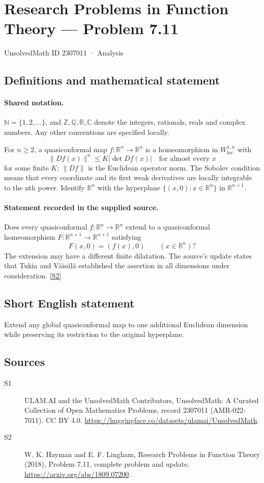 \documentclass[11pt]{article}
\newcommand{\sref}[2]{\hyperlink{source:#1:#2}{[S#2]}}
\begin{document}
\setcounter{section}{2307010}
\section{Research Problems in Function Theory — Problem 7.11}\label{2307011}
{\small\sffamily UnsolvedMath ID 2307011 · Analysis}
\subsection{Definitions and mathematical statement}

\paragraph{Shared notation.}$\mathbb N=\{1,2,\ldots\}$, and $\mathbb Z,\mathbb Q,\mathbb R,\mathbb C$ denote the integers, rationals, reals and complex numbers. Any other conventions are specified locally.


For $n\geq2$, a quasiconformal map $f:\mathbb R^n\to\mathbb R^n$ is a homeomorphism in $W^{1,n}_{\mathrm{loc}}$ with
\[\|Df(x)\|^n\leq K|\det Df(x)|\quad\text{for almost every }x\]
for some finite $K$; $\|Df\|$ is the Euclidean operator norm. The Sobolev condition means that every coordinate and its first weak derivatives are locally integrable to the nth power. Identify $\mathbb R^n$ with the hyperplane $\{(x,0):x\in\mathbb R^n\}$ in $\mathbb R^{n+1}$.
\paragraph{Statement recorded in the supplied source.}
Does every quasiconformal $f:\mathbb R^n\to\mathbb R^n$ extend to a quasiconformal homeomorphism $F:\mathbb R^{n+1}\to\mathbb R^{n+1}$ satisfying
\[F(x,0)=(f(x),0)\qquad(x\in\mathbb R^n)?\]
The extension may have a different finite dilatation. The source's update states that Tukia and V\"ais\"al\"a established the assertion in all dimensions under consideration. \sref{2307011}{2}
\subsection{Short English statement}
Extend any global quasiconformal map to one additional Euclidean dimension while preserving its restriction to the original hyperplane.
\subsection{Sources}
\begin{description}
\item[\hypertarget{source:2307011:1}{S1}] ULAM.AI and the UnsolvedMath Contributors, UnsolvedMath: A Curated Collection of Open Mathematics Problems, record 2307011 (AMR-022-7011). CC BY 4.0. \url{https://huggingface.co/datasets/ulamai/UnsolvedMath}.
\item[\hypertarget{source:2307011:2}{S2}] W. K. Hayman and E. F. Lingham, Research Problems in Function Theory (2018), Problem 7.11, complete problem and update. \url{https://arxiv.org/abs/1809.07200}.
\end{description}
\label{end:2307011}
\end{document}
